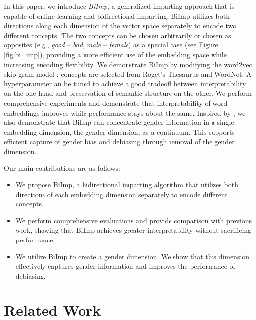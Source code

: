 \documentclass[11pt,a4paper]{article}
\def\proposedmethod{BiImp}
\begin{document}
In this paper, we introduce \textit{\proposedmethod{}}, a generalized imparting approach that is capable of online learning and bidirectional imparting. 
\proposedmethod{} utilizes both directions along each
dimension of the vector space separately to encode two
different concepts. The two concepts  can be chosen arbitrarily or chosen as opposites (e.g., \textit{good} -- \textit{bad}, \textit{male} -- \textit{female}) as a special case (see Figure \ref{fig:bi_imp}), providing a more efficient use of the embedding space while increasing encoding flexibility. 
We demonstrate \proposedmethod{} by modifying the word2vec
skip-gram model
\citep{mikolov13word2vec_a,mikolov13word2vec_b}; concepts
are selected from Roget's Thesaurus and WordNet.
A hyperparameter an be tuned to achieve a good tradeoff
between interpretability on the one hand and
preservation of semantic structure on the other.
We perform comprehensive experiments  and demonstrate that
interpretability of word embeddings improves while
performance stays about the same.
Inspired by  \citet{bolukbasi16debiasing}, we also
demonstrate that \proposedmethod{} can concentrate gender
information in a single embedding dimension, the gender dimension, as a continuum. 
This supports efficient capture of gender bias 
and debiasing through removal of the gender dimension.

Our main contributions are as follows:
\begin{itemize}
    \item We propose \proposedmethod{}, a bidirectional imparting algorithm that utilizes both directions of each embedding dimension separately to encode different concepts.
    
    \item We perform comprehensive evaluations and provide comparison with  previous work, showing that \proposedmethod{} achieves greater interpretability  without sacrificing performance. 
    
    \item We utilize \proposedmethod{} to create a gender dimension. We show that this dimension effectively captures gender information and improves the performance of debiasing.
\end{itemize}

\section{Related Work} \label{sec:related}
\end{document}
